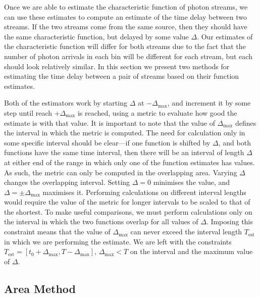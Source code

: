 \documentclass[11pt]{article}
\begin{document}
  Once we are able to estimate the characteristic function of photon streams, we
  can use these estimates to compute an estimate of the time delay between two
  streams. If the two streams come from the same source, then they should have
  the same characteristic function, but delayed by some value $\Delta$. Our
  estimates of the characteristic function will differ for both streams due to
  the fact that the number of photon arrivals in each bin will be different for
  each stream, but each should look relatively similar. In this section we
  present two methods for estimating the time delay between a pair of streams
  based on their function estimates.

  Both of the estimators work by starting $\Delta$ at $-\Delta_{\text{max}}$,
  and increment it by some step until reach $+\Delta_{\text{max}}$ is reached,
  using a metric to evaluate how good the estimate is with that value. It is
  important to note that the value of $\Delta_{\text{max}}$ defines the interval
  in which the metric is computed. The need for calculation only in some
  specific interval should be clear---if one function is shifted by $\Delta$,
  and both functions have the same time interval, then there will be an interval
  of length $\Delta$ at either end of the range in which only one of the
  function estimates has values. As such, the metric can only be computed in the
  overlapping area. Varying $\Delta$ changes the overlapping interval. Setting
  $\Delta=0$ minimises the value, and $\Delta=\pm\Delta_{\text{max}}$ maximises
  it. Performing calculations on different interval lengths would require the
  value of the metric for longer intervals to be scaled to that of the
  shortest. To make useful comparisons, we must perform calculations only on the
  interval in which the two functions overlap for all values of
  $\Delta$. Imposing this constraint means that the value of
  $\Delta_{\text{max}}$ can never exceed the interval length $T_{\text{est}}$ in which we are
  performing the estimate. We are left with the constraints
  $T_{\text{est}}=[t_0+\Delta_{\text{max}},
  T-\Delta_{\text{max}}],\,\Delta_{\text{max}}<T$ on the interval and the
  maximum value of $\Delta$.
\subsection{Area Method}
\label{sec-5.1}
\end{document}
